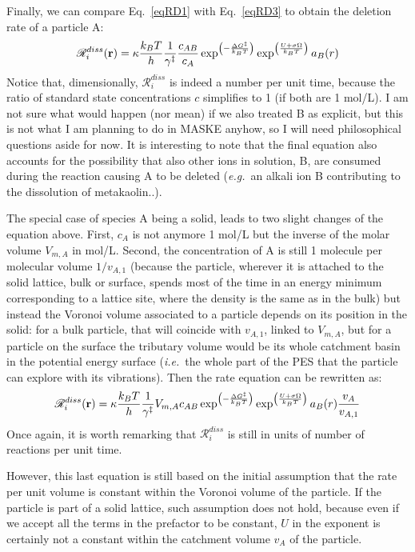\documentclass[12pt]{paper}    %
\newcommand{\RR}{\mathscr{R}}
\newcommand{\ie}{\textit{i.e.}~}
\newcommand{\eg}{\textit{e.g.}~}
\newcommand{\eqname}{Eq.~}
\begin{document}
Finally, we can compare \eqname\ref{eqRD1} with \eqname\ref{eqRD3} to obtain the deletion rate of a particle A:
%
\begin{equation}
\RR^{diss}_i ({\bf r}) = \kappa \frac{k_BT}{h} \frac{1}{\gamma^\ddag} \frac{c_{AB}}{c_A}\exp^{\left( - \frac{\Delta G^\ddag}{k_BT}\right)} \exp^{\left( \frac{U + \sigma \Omega}{k_BT}\right)} a_B(r) \label{eqRdiso}
\end{equation}
%
Notice that, dimensionally, $\RR^{diss}_i$ is indeed a number per unit time, because the ratio of standard state concentrations $c$ simplifies to 1 (if both are 1 mol/L). I am not sure what would happen (nor mean) if we also treated B as explicit, but this is not what I am planning to do in MASKE anyhow, so I will need philosophical questions aside for now. It is interesting to note that the final equation also accounts for the possibility that also other ions in solution, B, are consumed during the reaction causing A to be deleted (\eg an alkali ion B contributing to the dissolution of metakaolin..).

The special case of species A being a solid, leads to two slight changes of the equation above. First, $c_A$ is not anymore 1 mol/L but the inverse of the molar volume $V_{m,A}$ in mol/L. Second, the concentration of A is still 1 molecule per molecular volume $1/v_{A,1}$ (because the particle, wherever it is attached to the solid lattice, bulk or surface, spends most of the time in an energy minimum corresponding to a lattice site, where the density is the same as in the bulk) but instead the Voronoi volume associated to a particle depends on its position in the solid: for a bulk particle, that will coincide with $v_{A,1}$, linked to $V_{m,A}$, but for a particle on the surface the tributary volume would be its whole catchment basin in the potential energy surface (\ie the whole part of the PES that the particle can explore with its vibrations). Then the rate equation can be rewritten as:
\begin{equation}
\RR^{diss}_i ({\bf r}) = \kappa \frac{k_BT}{h} \frac{1}{\gamma^\ddag} V_{m,A} c_{AB}\exp^{\left( - \frac{\Delta G^\ddag}{k_BT}\right)} \exp^{\left( \frac{U + \sigma \Omega}{k_BT}\right)} a_B(r)  \frac{v_A}{v_{A,1}} \label{eqRd4}
\end{equation}
%
Once again, it is worth remarking that $\RR^{diss}_i$ is still in units of number of reactions per unit time.

However, this last equation is still based on the initial assumption that the rate per unit volume is constant within the Voronoi volume of the particle. If the particle is part of a solid lattice, such assumption does not hold, because even if we accept all the terms in the prefactor to be constant, $U$ in the exponent is certainly not a constant within the catchment volume $v_A$ of the particle.
\end{document}
